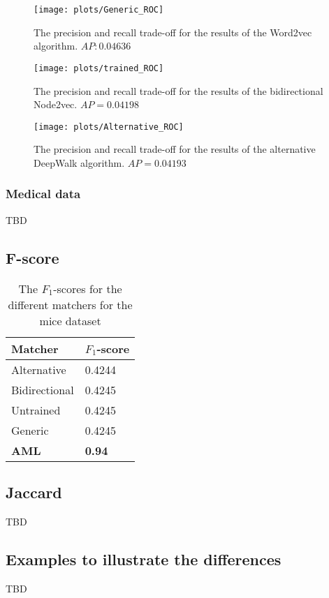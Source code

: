 \documentclass{article}
\begin{document}
  \begin{figure}[H]
   \centering
   \texttt{[image: plots/Generic\_ROC]}
   \caption{The precision and recall trade-off for the results of the Word2vec algorithm. $AP: 0.04636$}
   \label{ROC_generic}
  \end{figure}
 
  \begin{figure}[H]
   \centering
   \texttt{[image: plots/trained\_ROC]}
   \caption{The precision and recall trade-off for the results of the bidirectional Node2vec. $AP = 0.04198$}
   \label{ROC_trained}
  \end{figure}
  
  \begin{figure}[H]
   \centering
   \texttt{[image: plots/Alternative\_ROC]}
   \caption{The precision and recall trade-off for the results of the alternative DeepWalk algorithm. $AP = 0.04193$}
   \label{ROC_alternative}
  \end{figure}
   \subsubsection{Medical data}
   TBD
  
  \subsection{F-score}
  \begin{table}[H]
  \begin{tabular}{l|l}
  \textbf{Matcher} & \textbf{$F_1$-score}\\
  \hline
  Alternative & 0.4244\\
  Bidirectional & 0.4245\\
  Untrained & 0.4245\\
  Generic & 0.4245\\
  \textbf{AML} & \textbf{0.94}\\ %
  \end{tabular}
  \caption{The $F_1$-scores for the different matchers for the mice dataset}
  \label{fscores}
  \end{table}
  \subsection{Jaccard}
  TBD
  \subsection{Examples to illustrate the differences}
  TBD
   
\end{document}
